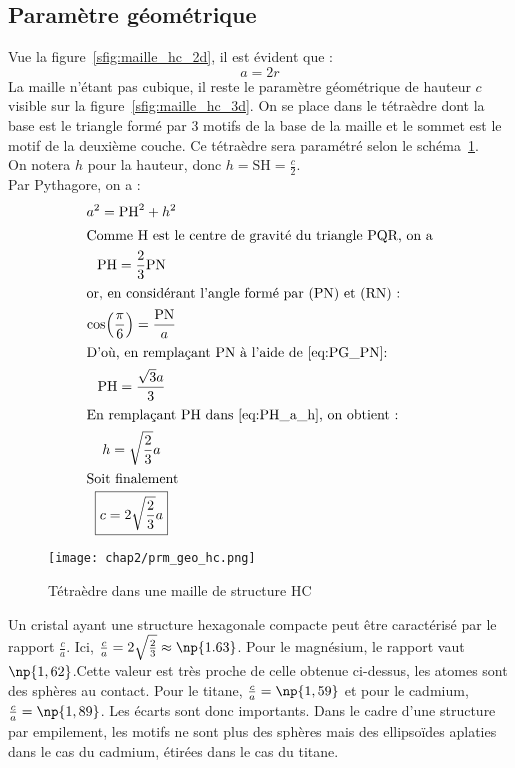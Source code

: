 \subsection{Paramètre géométrique}
Vue la figure~\ref{sfig:maille_hc_2d}, il est évident que :
\begin{equation}
    a = 2r \label{eq;a_r_hc}
\end{equation}
La maille n'étant pas cubique, il reste le paramètre géométrique
de hauteur $c$ visible sur la figure~\ref{sfig:maille_hc_3d}.
On se place dans le tétraèdre dont la base est le triangle formé
par 3 motifs de la base de la maille et le sommet est le motif
de la deuxième couche. Ce tétraèdre sera paramétré selon le
schéma~\ref{fig:prm_geo_hc}.\\
On notera $h$ pour la hauteur, donc $h = \text{SH} = \frac{c}{2}$.\\
Par Pythagore, on a :
\begin{gather}
    a^2 = \text{PH}^2 + h^2 \label{eq:PH_a_h}\\
    \intertext{Comme H est le centre de gravité du triangle PQR, on a}
    \text{PH} = \frac{2}{3}\text{PN}\label{eq:PG_PN}\\
    \intertext{or, en considérant l'angle formé par (PN) et (RN) :}
    \cos\Bigl( \frac{\pi}{6}\Bigr) = \frac{\text{PN}}{a}\\
    \intertext{D'où, en remplaçant PN à l'aide de~\ref{eq:PG_PN}:}
    \text{PH} = \frac{\sqrt{3}a}{3}\label{eq:PH_a}\\
    \intertext{En remplaçant PH dans~\ref{eq:PH_a_h}, on obtient :}
    h = \sqrt{\frac{2}{3}}a\\
    \intertext{Soit finalement}
    \boxed{c=2\sqrt{\frac{2}{3}}a} \label{eq:c_hc}
\end{gather}
\begin{figure}
    \centering
    \texttt{[image: chap2/prm\_geo\_hc.png]}
    \caption{Tétraèdre dans une maille
        de structure HC}\label{fig:prm_geo_hc}
\end{figure}
\begin{rem}
    Un cristal ayant une structure hexagonale compacte
    peut être caractérisé par le rapport $\frac{c}{a}$.
    Ici, $\frac{c}{a} = 2\sqrt{\frac{2}{3}}\approx \np{1.63}$.
    Pour le magnésium, le rapport vaut
    $\np{1,62}$.Cette valeur est très proche de celle
    obtenue ci-dessus, les atomes sont des sphères
    au contact. Pour le titane,
    $\frac{c}{a}=\np{1,59}$ et pour le cadmium,
    $\frac{c}{a}=\np{1,89}$. Les écarts sont donc
    importants. Dans le cadre d’une structure par empilement,
    les motifs ne sont plus des sphères mais des ellipsoïdes
    aplaties dans le cas du cadmium, étirées dans le cas du titane.
\end{rem}

